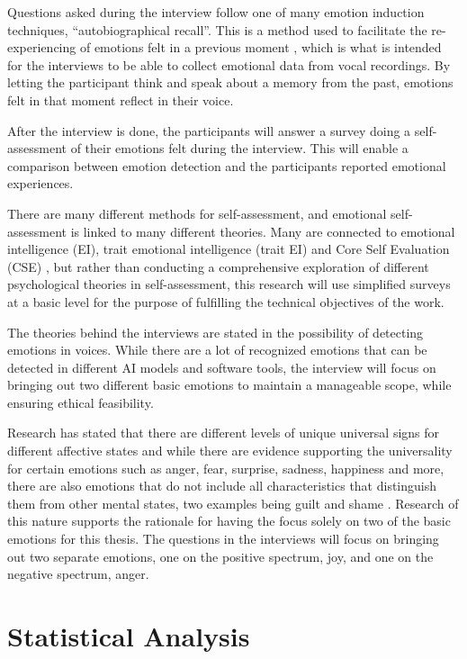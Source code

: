 Questions asked during the interview follow one of many emotion induction techniques, “autobiographical recall”. This is a method used to facilitate the re-experiencing of emotions felt in a previous moment \autocite{Siedlecka2019}, which is what is intended for the interviews to be able to collect emotional data from vocal recordings. By letting the participant think and speak about a memory from the past, emotions felt in that moment reflect in their voice.

After the interview is done, the participants will answer a survey doing a self-assessment of their emotions felt during the interview. This will enable a comparison between emotion detection and the participants reported emotional experiences.

There are many different methods for self-assessment, and emotional self-assessment is linked to many different theories. Many are connected to emotional intelligence (EI), trait emotional intelligence (trait EI) and Core Self Evaluation (CSE) \autocite{Montasem2013}, but rather than conducting a comprehensive exploration of different psychological theories in self-assessment, this research will use simplified surveys at a basic level for the purpose of fulfilling the technical objectives of the work. 

The theories behind the interviews are stated in the possibility of detecting emotions in voices. While there are a lot of recognized emotions that can be detected in different AI models and software tools, the interview will focus on bringing out two different basic emotions to maintain a manageable scope, while ensuring ethical feasibility.

Research has stated that there are different levels of unique universal signs for different affective states and while there are evidence supporting the universality for certain emotions such as anger, fear, surprise, sadness, happiness and more, there are also emotions that do not include all characteristics that distinguish them from other mental states, two examples being guilt and shame \autocite{Ekman2011}. Research of this nature supports the rationale for having the focus solely on two of the basic emotions for this thesis. The questions in the interviews will focus on bringing out two separate emotions, one on the positive spectrum, joy, and one on the negative spectrum, anger.



\section{Statistical Analysis}
\label{sec:theo-stat-analyse}

